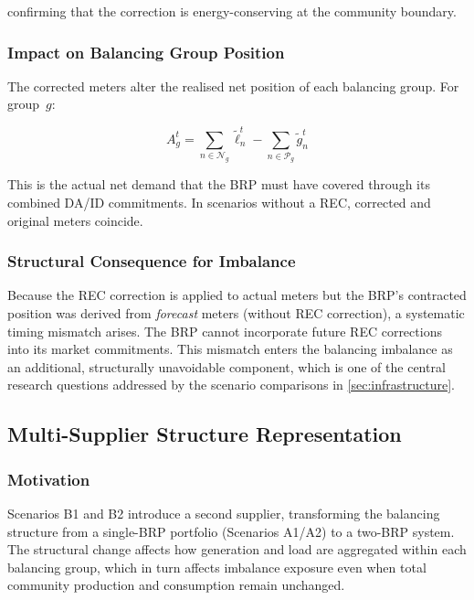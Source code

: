 \documentclass[12pt,a4paper]{article}
\begin{document}
confirming that the correction is energy-conserving at the community boundary.

\subsubsection{Impact on Balancing Group Position}

The corrected meters alter the realised net position of each balancing group.
For group~$g$:

\begin{equation}
A_{g}^{t}
  = \sum_{n \in \mathcal{N}_{g}} \tilde{\ell}_{n}^{t}
  - \sum_{n \in \mathcal{P}_{g}} \tilde{g}_{n}^{t}
\label{eq:bg_actual_infra}
\end{equation}

This is the actual net demand that the BRP must have covered through its
combined DA/ID commitments.  In scenarios without a REC, corrected and
original meters coincide.

\subsubsection{Structural Consequence for Imbalance}

Because the REC correction is applied to actual meters but the BRP's contracted
position was derived from \emph{forecast} meters (without REC correction), a
systematic timing mismatch arises.  The BRP cannot incorporate future REC
corrections into its market commitments.  This mismatch enters the balancing
imbalance as an additional, structurally unavoidable component, which is one
of the central research questions addressed by the scenario comparisons in
\cref{sec:infrastructure}.

\subsection{Multi-Supplier Structure Representation}
\label{subsec:multisupplier}

\subsubsection{Motivation}

Scenarios B1 and B2 introduce a second supplier, transforming the balancing
structure from a single-BRP portfolio (Scenarios A1/A2) to a two-BRP system.
The structural change affects how generation and load are aggregated within
each balancing group, which in turn affects imbalance exposure even when total
community production and consumption remain unchanged.
\end{document}
